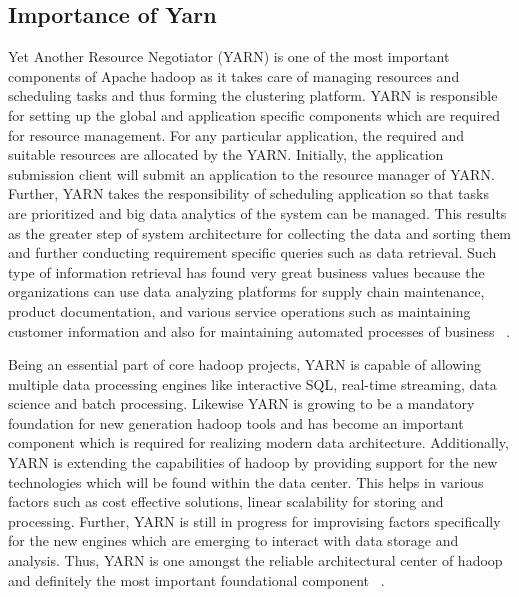 \subsection{Importance of Yarn}
Yet Another Resource Negotiator (YARN) is one of the most important components 
of Apache hadoop as it takes care of managing resources and scheduling tasks and
thus forming the clustering platform. YARN is responsible for setting up the 
global and application specific components which are required for resource 
management. For any particular application, the required and suitable resources 
are allocated by the YARN. Initially, the application submission client will 
submit an application to the resource manager of YARN. Further, YARN takes the 
responsibility of scheduling application so that tasks are prioritized and big 
data analytics of the system can be managed. This results as the greater step 
of system architecture for collecting the data and sorting them and further 
conducting requirement specific queries such as data retrieval. Such type of 
information retrieval has found very great business values because the 
organizations can use data analyzing platforms for supply chain maintenance, 
product documentation, and various service operations such as maintaining 
customer information and also for maintaining automated processes of business
~\cite{hid-sp18-406-hadoop-intro6}.

Being an essential part of core hadoop projects, YARN is capable of allowing 
multiple data processing engines like interactive SQL, real-time streaming, data
science and batch processing. Likewise YARN is growing to be a mandatory 
foundation for new generation hadoop tools and has become an important component
which is required for realizing modern data architecture. Additionally, YARN is 
extending the capabilities of hadoop by providing support for the new 
technologies which will be found within the data center. This helps in various 
factors such as cost effective solutions, linear scalability for storing and 
processing. Further, YARN is still in progress for improvising factors 
specifically for the new engines which are emerging to interact with data 
storage and analysis. Thus, YARN is one amongst the reliable architectural 
center of hadoop  and definitely  the most important foundational component
~\cite{hid-sp18-406-hadoop-intro7}.


